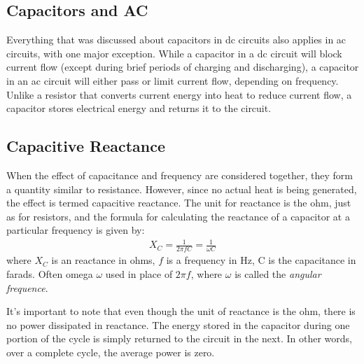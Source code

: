 \documentclass[../../document]{subfiles}
\begin{document}
\subsection{Capacitors and AC}
Everything that was discussed about capacitors in dc circuits also applies in
ac circuits, with one major exception. While a capacitor in a dc circuit will
block current flow (except during brief periods of charging and discharging), a
capacitor in an ac circuit will either pass or limit current flow, depending on
frequency. Unlike a resistor that converts current energy into heat to reduce
current flow, a capacitor stores electrical energy and returns it to the
circuit. \cite{practical_electronics}

\subsection{Capacitive Reactance}
When the effect of capacitance and frequency are considered together, they
form a quantity similar to resistance. However, since no actual heat is being
generated, the effect is termed capacitive reactance. The unit for reactance
is the ohm, just as for resistors, and the formula for calculating the
reactance of a capacitor at a particular frequency is given by:
\begin{gather}
	X_C=\frac{1}{2\pi fC}=\frac{1}{\omega C} \tag{Capacitive reactance}
\end{gather} 
where \(X_C\) is an reactance in ohms, \(f\) is a frequency in \unit{\hertz}, C
is the capacitance in farads. Often omega \(\omega\) used in place of \(2\pi
f\), where \(\omega\) is called the \emph{angular frequence}.
\cite{practical_electronics}

It’s important to note that even though the unit of reactance is the ohm, there
is no power dissipated in reactance. The energy stored in the capacitor during
one portion of the cycle is simply returned to the circuit in the next. In
other words, over a complete cycle, the average power is zero.
\cite{practical_electronics}
\end{document}
